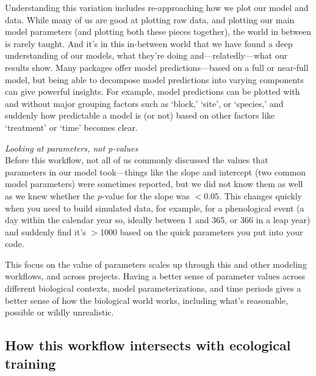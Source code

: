 \documentclass[11pt]{article}
\begin{document}
{Understanding this variation includes re-approaching how we plot our model and data. While many of us are good at plotting raw data, and plotting our main model parameters (and plotting both these pieces together), the world in between is rarely taught. And it's in this in-between world that we have found a deep understanding of our models, what they're doing and---relatedly---what our results show. Many packages offer model predictions---based on a full or near-full model, but being able to decompose model predictions into varying components can give powerful insights. For example, model predictions can be plotted with and without major grouping factors such as `block,' `site', or `species,' and suddenly how predictable a model is (or not) based on other factors like `treatment' or `time' becomes clear. 

 \emph{Looking at parameters, not p-values} \\
Before this workflow, not all of us commonly discussed the values that parameters in our model took---things like the slope and intercept (two common model parameters) were sometimes reported, but we did not know them as well as we knew whether the $p$-value for the slope was $<0.05$. This changes quickly when you need to build simulated data, for example, for a phenological event (a day within the calendar year so, ideally between 1 and 365, or 366 in a leap year) and suddenly find it's $>$1000 based on the quick parameters you put into your code. 

This focus on the value of parameters scales up through this and other modeling workflows, and across projects. Having a better sense of parameter values across different biological contexts, model parameterizations, and time periods gives a better sense of how the biological world works, including what's reasonable, possible or wildly unrealistic. %

\subsection{How this workflow intersects with ecological training} %

}
\end{document}
